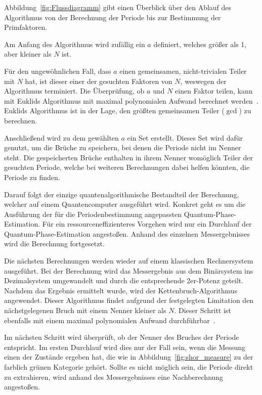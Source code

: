 \bigskip

Abbildung~\ref{fig:Flussdiagramm} gibt einen Überblick über den Ablauf des Algorithmus 
von der Berechnung der Periode bis zur Bestimmung der Primfaktoren.

Am Anfang des Algorithmus wird zufällig ein \(a\) definiert, 
welches größer als 1, aber kleiner als \(N\) ist.

Für den ungewöhnlichen Fall, dass \(a\) einen gemeinsamen, nicht-trivialen Teiler mit \(N\) hat, 
ist dieser einer der gesuchten Faktoren von \(N\), 
weswegen der Algorithmus terminiert.
Die Überprüfung, ob \(a\) und \(N\) einen Faktor teilen, 
kann mit Euklids Algorithmus mit maximal polynomialen Aufwand berechnet werden~\cite[301]{homeister2023quantum215}. 
Euklids Algorithmus ist in der Lage, den größten gemeinsamen Teiler (\(\gcd\)) zu berechnen.

Anschließend wird zu dem gewählten \(a\) ein Set erstellt.
Dieses Set wird dafür genutzt, um die Brüche zu speichern, 
bei denen die Periode nicht im Nenner steht. 
Die gespeicherten Brüche enthalten in ihrem Nenner womöglich Teiler der gesuchten Periode, 
welche bei weiteren Berechnungen dabei helfen könnten, die Periode zu finden.

Darauf folgt der einzige quantenalgorithmische Bestandteil der Berechnung, 
welcher auf einem Quantencomputer ausgeführt wird.
Konkret geht es um die Ausführung der für die Periodenbestimmung angepassten Quantum-Phase-Estimation. 
Für ein ressourceneffizienteres Vorgehen wird nur ein Durchlauf der Quantum-Phase-Estimation angestoßen.
Anhand des einzelnen Messergebnisses wird die Berechnung fortgesetzt.

Die nächsten Berechnungen werden wieder auf einem klassischen Rechnersystem ausgeführt.
Bei der Berechnung wird das Messergebnis aus dem Binärsystem ins Dezimalsystem umgewandelt
und durch die entsprechende 2er-Potenz geteilt.
Nachdem das Ergebnis ermittelt wurde, 
wird der Kettenbruch-Algorithmus angewendet. 
Dieser Algorithmus findet aufgrund der festgelegten Limitation den nächstgelegenen Bruch mit einem Nenner kleiner als \(N\).
Dieser Schritt ist ebenfalls mit einem maximal polynomialen Aufwand durchführbar~\autocite[230]{nielsen_chuang_2010}.

Im nächsten Schritt wird überprüft, ob der Nenner des Bruches der Periode entspricht.
Im ersten Durchlauf wird dies nur der Fall sein, 
wenn die Messung einen der Zustände ergeben hat, 
die wie in Abbildung~\ref{fig:shor_measure} zu der farblich grünen Kategorie gehört.
Sollte es nicht möglich sein, die Periode direkt zu extrahieren, 
wird anhand des Messergebnisses eine Nachberechnung angestoßen.

